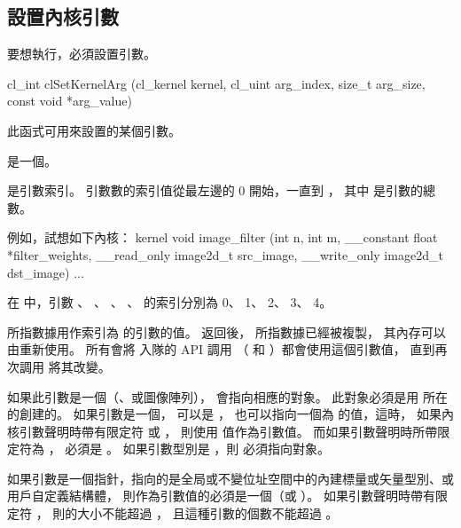 \subsection{設置內核引數}

要想執行，必須設置引數。


\startCLFUNC
cl_int clSetKernelArg (cl_kernel kernel,
			cl_uint arg_index,
			size_t arg_size,
			const void *arg_value)
\stopCLFUNC

此函式可用來設置的某個引數。

 是一個。

 是引數索引。
引數數的索引值從最左邊的 0 開始，一直到 ，
其中  是引數的總數。

例如，試想如下內核：
\startclc
kernel void
image_filter (int n, int m,
		__constant float *filter_weights,
		__read_only image2d_t src_image,
		__write_only image2d_t dst_image)
{
	...
}
\stopclc

在  中，引數 、 、 、
、  的索引分別為 0、 1、 2、 3、 4。

 所指數據用作索引為  的引數的值。
 返回後，  所指數據已經被複製，
其內存可以由重新使用。
所有會將  入隊的 API 調用
（  和 ）都會使用這個引數值，
直到再次調用  將其改變。

如果此引數是一個（、或圖像陣列），
 會指向相應的對象。
此對象必須是用  所在的創建的。
如果引數是一個，  可以是 ，
也可以指向一個為  的值，這時，
如果內核引數聲明時帶有限定符  或 ，
則使用  值作為引數值。
而如果引數聲明時所帶限定符為 ，  必須是 。
如果引數型別是 ，則  必須指向對象。

如果引數是一個指針，指向的是全局或不變位址空間中的內建標量或矢量型別、或用戶自定義結構體，
則作為引數值的必須是一個（或 ）。
如果引數聲明時帶有限定符 ，
則的大小不能超過 ，
且這種引數的個數不能超過 。

